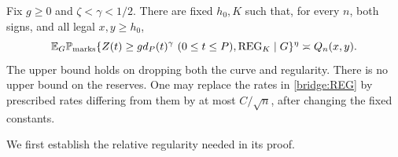 \begin{theorem}
\label{bridge:all-reserves}
Fix $g\ge0$ and $\zeta<\gamma<1/2$. There are fixed $h_0,K$ such
that, for every $n$, both signs, and all legal $x,y\ge h_0$,
\begin{equation}
 \mathbb E_G\mathbb P_{\rm marks}
 \{Z(t)\ge g d_P(t)^\gamma\ (0\le t\le P),
                \operatorname{REG}_K\mid G\}^{\eta}
 \asymp Q_n(x,y).
 \label{bridge:strong}
\end{equation}
The upper bound holds on dropping both the curve and regularity.
There is no upper bound on the reserves. One may replace the rates in
\eqref{bridge:REG} by prescribed rates differing from them by at most
$C/\sqrt n$, after changing the fixed constants.
\end{theorem}

We first establish the relative regularity needed in its proof.

